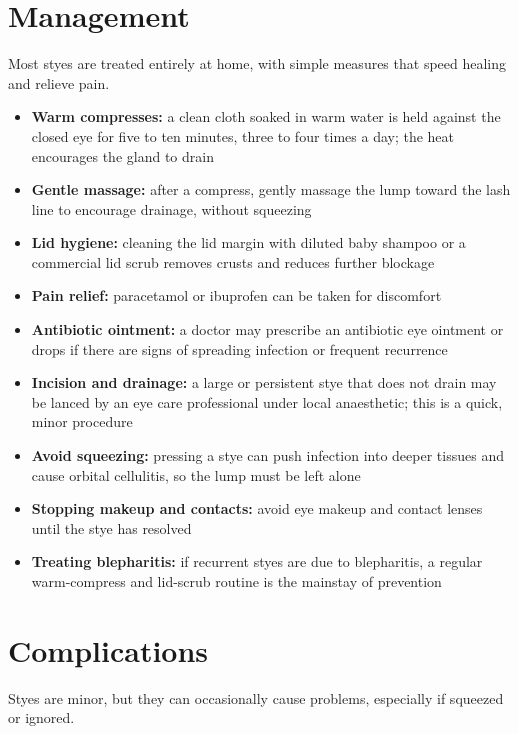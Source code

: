 \section*{Management}
Most styes are treated entirely at home, with simple measures that speed healing and relieve pain.

\begin{itemize}
    \item \textbf{Warm compresses:} a clean cloth soaked in warm water is held against the closed eye for five to ten minutes, three to four times a day; the heat encourages the gland to drain
    \item \textbf{Gentle massage:} after a compress, gently massage the lump toward the lash line to encourage drainage, without squeezing
    \item \textbf{Lid hygiene:} cleaning the lid margin with diluted baby shampoo or a commercial lid scrub removes crusts and reduces further blockage
    \item \textbf{Pain relief:} paracetamol or ibuprofen can be taken for discomfort
    \item \textbf{Antibiotic ointment:} a doctor may prescribe an antibiotic eye ointment or drops if there are signs of spreading infection or frequent recurrence
    \item \textbf{Incision and drainage:} a large or persistent stye that does not drain may be lanced by an eye care professional under local anaesthetic; this is a quick, minor procedure
    \item \textbf{Avoid squeezing:} pressing a stye can push infection into deeper tissues and cause orbital cellulitis, so the lump must be left alone
    \item \textbf{Stopping makeup and contacts:} avoid eye makeup and contact lenses until the stye has resolved
    \item \textbf{Treating blepharitis:} if recurrent styes are due to blepharitis, a regular warm-compress and lid-scrub routine is the mainstay of prevention
\end{itemize}

\section*{Complications}
Styes are minor, but they can occasionally cause problems, especially if squeezed or ignored.

